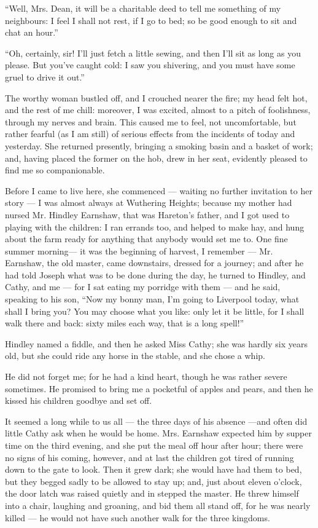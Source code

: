 \par “Well, Mrs. Dean, it will be a charitable deed to tell me something of my neighbours: I feel I shall not rest, if I go to bed; so be good enough to sit and chat an hour.”
\par “Oh, certainly, sir! I'll just fetch a little sewing, and then I'll sit as long as you please. But you've caught cold: I saw you shivering, and you must have some gruel to drive it out.”
\par The worthy woman bustled off, and I crouched nearer the fire; my head felt hot, and the rest of me chill: moreover, I was excited, almost to a pitch of foolishness, through my nerves and brain. This caused me to feel, not uncomfortable, but rather fearful (as I am still) of serious effects from the incidents of today and yesterday. She returned presently, bringing a smoking basin and a basket of work; and, having placed the former on the hob, drew in her seat, evidently pleased to find me so companionable.
\par Before I came to live here, she commenced — waiting no further invitation to her story — I was almost always at Wuthering Heights; because my mother had nursed Mr. Hindley Earnshaw, that was Hareton's father, and I got used to playing with the children: I ran errands too, and helped to make hay, and hung about the farm ready for anything that anybody would set me to. One fine summer morning— it was the beginning of harvest, I remember — Mr. Earnshaw, the old master, came downstairs, dressed for a journey; and after he had told Joseph what was to be done during the day, he turned to Hindley, and Cathy, and me — for I sat eating my porridge with them — and he said, speaking to his son, “Now my bonny man, I'm going to Liverpool today, what shall I bring you? You may choose what you like: only let it be little, for I shall walk there and back: sixty miles each way, that is a long spell!”
\par Hindley named a fiddle, and then he asked Miss Cathy; she was hardly six years old, but she could ride any horse in the stable, and she chose a whip.
\par He did not forget me; for he had a kind heart, though he was rather severe sometimes. He promised to bring me a pocketful of apples and pears, and then he kissed his children goodbye and set off.
\par It seemed a long while to us all — the three days of his absence —and often did little Cathy ask when he would be home. Mrs. Earnshaw expected him by supper time on the third evening, and she put the meal off hour after hour; there were no signs of his coming, however, and at last the children got tired of running down to the gate to look. Then it grew dark; she would have had them to bed, but they begged sadly to be allowed to stay up; and, just about eleven o'clock, the door latch was raised quietly and in stepped the master. He threw himself into a chair, laughing and groaning, and bid them all stand off, for he was nearly killed — he would not have such another walk for the three kingdoms.
